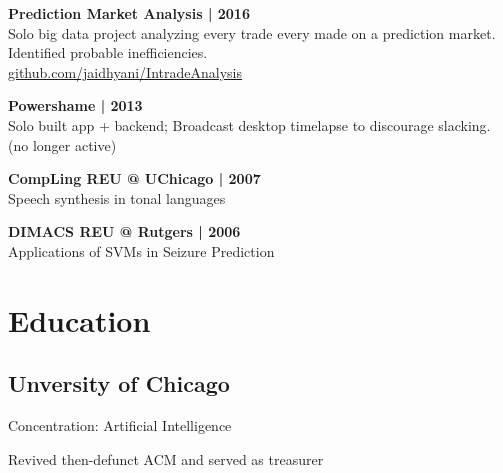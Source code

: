 \documentclass[]{resume}
\begin{document}
\begin{minipage}[t]{0.33\textwidth}
\textbf{Prediction Market Analysis | 2016}\\
Solo big data project analyzing every trade every made on a prediction market. Identified
probable inefficiencies.\\
\href{http://github.com/jaidhyani/IntradeAnalysis}{\quad github.com/jaidhyani/IntradeAnalysis }
\sectionsep

\textbf{Powershame | 2013} \\
Solo built app + backend; Broadcast desktop timelapse to discourage slacking. (no longer active)
\sectionsep

\textbf{CompLing REU @ UChicago | 2007}\\
Speech synthesis in tonal languages
\sectionsep

\textbf{DIMACS REU @ Rutgers | 2006}\\
Applications of SVMs in Seizure Prediction
\\
\section{Education}
\subsection{Unversity of Chicago}
\sectionsep
\begin{tightemize}
\item Concentration: Artificial Intelligence
\item Revived then-defunct ACM and served as treasurer
\end{tightemize}
\sectionsep


%
%

\end{minipage}
\hfill
\end{document}
